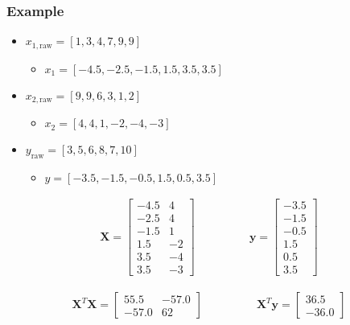 \begin{frame}\frametitle{Example}
	\begin{itemize}
		\item	$x_{1,\text{raw}} = [1, 3, 4, 7, 9, 9]$
		\begin{itemize}
			\item	$x_1 = [-4.5, -2.5, -1.5 , 1.5 , 3.5, 3.5]$
		\end{itemize}
		\item	$x_{2,\text{raw}} = [9, 9, 6, 3, 1, 2]$
		\begin{itemize}
			\item	$x_2 = [4, 4, 1, -2, -4, -3]$
		\end{itemize}
		\item	$y_{\text{raw}} = [3,5,6,8,7,10]$
		\begin{itemize}
			\item	$y = [-3.5, -1.5, -0.5, 1.5, 0.5, 3.5]$
		\end{itemize}
	\end{itemize}

	$$
	\begin{array}{lr}
		\mathbf{X} =
		\begin{bmatrix}
			-4.5 & 4\\
			-2.5 & 4 \\
			-1.5 & 1 \\
			1.5 & -2 \\
			3.5 & -4 \\
			3.5 & -3
		\end{bmatrix}
		&\qquad\qquad \mathbf{y} =
		\begin{bmatrix}
			-3.5 \\
			-1.5\\
			-0.5\\
			1.5\\
			0.5\\
			3.5
		\end{bmatrix}
	\end{array}
	$$

	$$
	\begin{array}{lr}
		\mathbf{X}^T\mathbf{X} =
		\begin{bmatrix}
			55.5 & -57.0 \\-57.0 & 62
		\end{bmatrix}
		&\qquad\qquad \mathbf{X}^T\mathbf{y} =
		\begin{bmatrix}
			36.5 \\
			-36.0
		\end{bmatrix}
	\end{array}
	$$
\end{frame}

